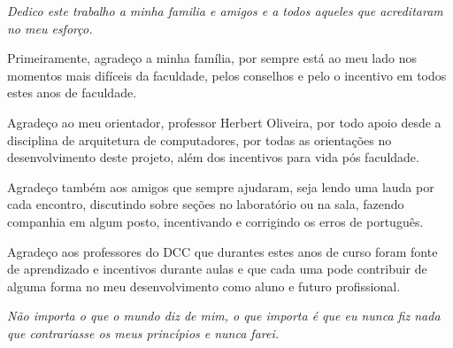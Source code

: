 \documentclass[
	12pt, %
    oneside, %
	a4paper, %
	chapter=TITLE, %
	english, %
	brazil %
	]{abntex2}
\begin{document}
\frenchspacing 
\imprimircapa
\imprimirfolhaderosto
\imprimirfolhadeaprovacao
\begin{dedicatoria}
   \vspace*{\fill}
   \centering
   \noindent
   \textit{Dedico este trabalho a minha familia e amigos e a todos aqueles que acreditaram no meu esforço. } \vspace*{\fill}
\end{dedicatoria}
\begin{agradecimentos}[Agradecimentos]
\par
Primeiramente, agradeço a minha família, por sempre está ao meu lado nos momentos mais difíceis da faculdade, pelos conselhos e pelo o incentivo em todos estes anos de faculdade.
\par
Agradeço ao meu orientador, professor Herbert Oliveira, por todo apoio desde a disciplina de arquitetura de computadores, por todas as orientações no desenvolvimento deste projeto, além dos incentivos para vida pós faculdade.
\par
Agradeço também aos amigos que sempre ajudaram, seja lendo uma lauda por cada encontro, discutindo sobre seções no laboratório ou na sala, fazendo companhia em algum posto, incentivando e corrigindo os erros de português. 
\par
Agradeço aos professores do DCC que durantes estes anos de curso foram fonte de aprendizado e incentivos durante aulas e que cada uma pode contribuir de alguma forma no meu desenvolvimento como aluno e futuro profissional.
\end{agradecimentos}
\begin{epigrafe}
    \vspace*{\fill}
	\begin{flushright}
		\textit{Não importa o que o mundo diz de mim, o que importa é que eu nunca fiz nada que contrariasse os meus princípios e nunca farei.}
	\end{flushright}
\end{epigrafe}
\setlength{\absparsep}{18pt} %
\end{document}
